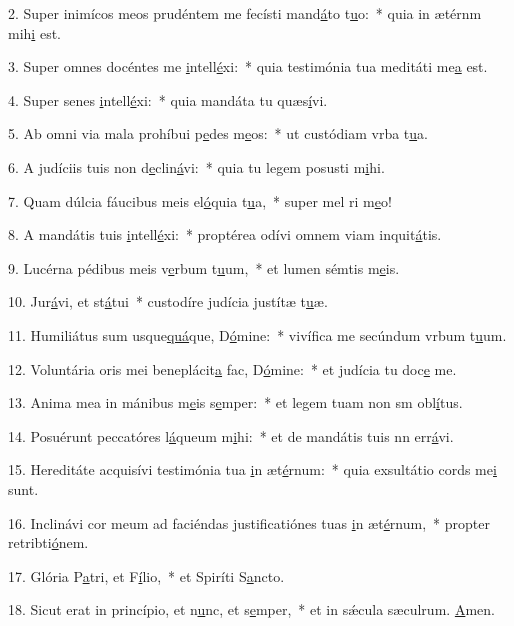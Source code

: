 2. Super inimícos meos prudéntem me fecísti mand\uline{á}to t\uline{u}o:~* quia in ætérnm mih\uline{i} est.\par 
3. Super omnes docéntes me \uline{i}ntell\uline{é}xi:~* quia testimónia tua meditáti me\uline{a} est.\par 
4. Super senes \uline{i}ntell\uline{é}xi:~* quia mandáta tu quæs\uline{í}vi.\par 
5. Ab omni via mala prohíbui p\uline{e}des m\uline{e}os:~* ut custódiam vrba t\uline{u}a.\par 
6. A judíciis tuis non d\uline{e}clin\uline{á}vi:~* quia tu legem posusti m\uline{i}hi.\par 
7. Quam dúlcia fáucibus meis el\uline{ó}quia t\uline{u}a,~* super mel ri m\uline{e}o!\par 
8. A mandátis tuis \uline{i}ntell\uline{é}xi:~* proptérea odívi omnem viam inquit\uline{á}tis.\par 
9. Lucérna pédibus meis v\uline{e}rbum t\uline{u}um,~* et lumen sémtis m\uline{e}is.\par 
10. Jur\uline{á}vi, et st\uline{á}tui~* custodíre judícia justítæ t\uline{u}æ.\par 
11. Humiliátus sum usque\uline{quá}que, D\uline{ó}mine:~* vivífica me secúndum vrbum t\uline{u}um.\par 
12. Voluntária oris mei beneplácit\uline{a} fac, D\uline{ó}mine:~* et judícia tu doc\uline{e} me.\par 
13. Anima mea in mánibus m\uline{e}is s\uline{e}mper:~* et legem tuam non sm obl\uline{í}tus.\par 
14. Posuérunt peccatóres l\uline{á}queum m\uline{i}hi:~* et de mandátis tuis nn err\uline{á}vi.\par 
15. Hereditáte acquisívi testimónia tua \uline{i}n æt\uline{é}rnum:~* quia exsultátio cords me\uline{i} sunt.\par 
16. Inclinávi cor meum ad faciéndas justificatiónes tuas \uline{i}n æt\uline{é}rnum,~* propter retribti\uline{ó}nem.\par 
17. Glória P\uline{a}tri, et F\uline{í}lio,~* et Spiríti S\uline{a}ncto.\par 
18. Sicut erat in princípio, et n\uline{u}nc, et s\uline{e}mper,~* et in sǽcula sæculrum. \uline{A}men.\par 
